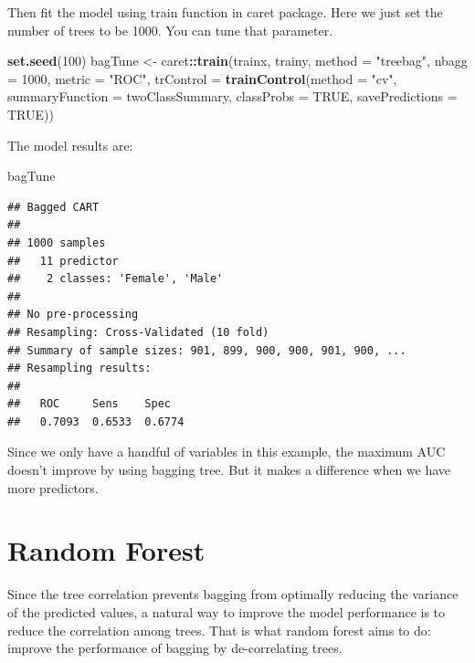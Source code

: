 \documentclass[12pt,]{krantz}
\makeatletter
\newenvironment{Shaded}{\begin{snugshade}}{\end{snugshade}}
\newcommand{\DataTypeTok}[1]{\textcolor[rgb]{0.27,0.27,0.27}{#1}}
\newcommand{\DecValTok}[1]{\textcolor[rgb]{0.06,0.06,0.06}{#1}}
\newcommand{\KeywordTok}[1]{\textcolor[rgb]{0.27,0.27,0.27}{\textbf{#1}}}
\newcommand{\NormalTok}[1]{#1}
\newcommand{\OperatorTok}[1]{\textcolor[rgb]{0.43,0.43,0.43}{\textbf{#1}}}
\newcommand{\OtherTok}[1]{\textcolor[rgb]{0.37,0.37,0.37}{#1}}
\newcommand{\StringTok}[1]{\textcolor[rgb]{0.5,0.5,0.5}{#1}}
\newenvironment{kframe}{%
\medskip{}
\setlength{\fboxsep}{.8em}
 \def\at@end@of@kframe{}%
 \ifinner\ifhmode%
  \def\at@end@of@kframe{\end{minipage}}%
  \begin{minipage}{\columnwidth}%
 \fi\fi%
 \def\FrameCommand##1{\hskip\@totalleftmargin \hskip-\fboxsep
 \colorbox{shadecolor}{##1}\hskip-\fboxsep
     \hskip-\linewidth \hskip-\@totalleftmargin \hskip\columnwidth}%
 \MakeFramed {\advance\hsize-\width
   \@totalleftmargin\z@ \linewidth\hsize
   \@setminipage}}%
 {\par\unskip\endMakeFramed%
 \at@end@of@kframe}
\renewenvironment{Shaded}{\begin{kframe}}{\end{kframe}}
\makeatother
\begin{document}
Then fit the model using train function in caret package. Here we just set the number of trees to be 1000. You can tune that parameter.

\begin{Shaded}
\begin{Highlighting}[]
\KeywordTok{set.seed}\NormalTok{(}\DecValTok{100}\NormalTok{)}
\NormalTok{bagTune <-}\StringTok{ }\NormalTok{caret}\OperatorTok{::}\KeywordTok{train}\NormalTok{(trainx, trainy, }
                           \DataTypeTok{method =} \StringTok{"treebag"}\NormalTok{,}
                           \DataTypeTok{nbagg =} \DecValTok{1000}\NormalTok{,}
                           \DataTypeTok{metric =} \StringTok{"ROC"}\NormalTok{,}
                           \DataTypeTok{trControl =} \KeywordTok{trainControl}\NormalTok{(}\DataTypeTok{method =} \StringTok{"cv"}\NormalTok{,}
                           \DataTypeTok{summaryFunction =}\NormalTok{ twoClassSummary,}
                           \DataTypeTok{classProbs =} \OtherTok{TRUE}\NormalTok{,}
                           \DataTypeTok{savePredictions =} \OtherTok{TRUE}\NormalTok{))}
\end{Highlighting}
\end{Shaded}

The model results are:

\begin{Shaded}
\begin{Highlighting}[]
\NormalTok{bagTune}
\end{Highlighting}
\end{Shaded}

\begin{verbatim}
## Bagged CART 
## 
## 1000 samples
##   11 predictor
##    2 classes: 'Female', 'Male' 
## 
## No pre-processing
## Resampling: Cross-Validated (10 fold) 
## Summary of sample sizes: 901, 899, 900, 900, 901, 900, ... 
## Resampling results:
## 
##   ROC     Sens    Spec  
##   0.7093  0.6533  0.6774
\end{verbatim}

Since we only have a handful of variables in this example, the maximum AUC doesn't improve by using bagging tree. But it makes a difference when we have more predictors.

\hypertarget{random-forest}{%
\section{Random Forest}\label{random-forest}}

Since the tree correlation prevents bagging from optimally reducing the variance of the predicted values, a natural way to improve the model performance is to reduce the correlation among trees. That is what random forest aims to do: improve the performance of bagging by de-correlating trees.
\end{document}
